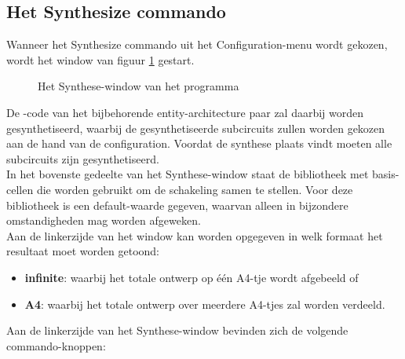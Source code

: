 \subsection{Het Synthesize commando}
Wanneer het Synthesize commando uit het Configuration-menu
wordt gekozen, wordt het window van figuur \ref{synth-window} gestart.
\begin{figure}[htb]
\centerline{}
\caption{Het Synthese-window van het programma }
\label{synth-window}
\end{figure}
De -code van het bijbehorende entity-architecture paar zal daarbij worden
gesynthetiseerd, waarbij de gesynthetiseerde subcircuits zullen worden
gekozen aan de hand van de configuration.
Voordat de synthese plaats vindt moeten alle subcircuits zijn gesynthetiseerd.\\
In het bovenste gedeelte van het Synthese-window staat de bibliotheek met basis-cellen die worden
gebruikt om de schakeling samen te stellen.
Voor deze bibliotheek is een default-waarde gegeven, waarvan alleen in
bijzondere omstandigheden mag worden afgeweken.\\
Aan de linkerzijde van het window kan worden opgegeven in welk formaat het
resultaat moet worden getoond:
\begin{itemize}
\item {\bf infinite}: waarbij het totale ontwerp op \'e\'en A4-tje wordt afgebeeld of
\item {\bf A4}: waarbij het totale ontwerp over meerdere A4-tjes zal worden verdeeld.
\end{itemize}
Aan de linkerzijde van het Synthese-window bevinden zich de volgende
commando-knoppen:
